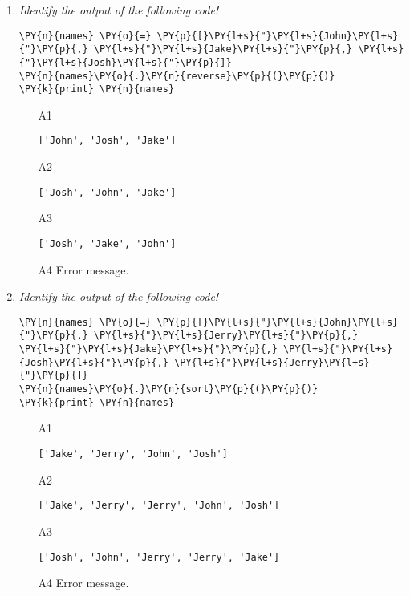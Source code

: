 \begin{enumerate}
\vspace{6mm}

\item {\em Identify the output of the following code!}\\

\begin{Verbatim}[commandchars=\\\{\}]
\PY{n}{names} \PY{o}{=} \PY{p}{[}\PY{l+s}{"}\PY{l+s}{John}\PY{l+s}{"}\PY{p}{,} \PY{l+s}{"}\PY{l+s}{Jake}\PY{l+s}{"}\PY{p}{,} \PY{l+s}{"}\PY{l+s}{Josh}\PY{l+s}{"}\PY{p}{]}
\PY{n}{names}\PY{o}{.}\PY{n}{reverse}\PY{p}{(}\PY{p}{)}
\PY{k}{print} \PY{n}{names}
\end{Verbatim}
\vspace{6mm}

\begin{enumerate}
\item[A1] 
\begin{verbatim}
['John', 'Josh', 'Jake']
\end{verbatim}
\item[A2] 
\begin{verbatim}
['Josh', 'John', 'Jake']
\end{verbatim}
\item[A3] 
\begin{verbatim}
['Josh', 'Jake', 'John']
\end{verbatim}
\item[A4] Error message.
\end{enumerate}

\vspace{6mm}

\item {\em Identify the output of the following code!}\\

\begin{Verbatim}[commandchars=\\\{\}]
\PY{n}{names} \PY{o}{=} \PY{p}{[}\PY{l+s}{"}\PY{l+s}{John}\PY{l+s}{"}\PY{p}{,} \PY{l+s}{"}\PY{l+s}{Jerry}\PY{l+s}{"}\PY{p}{,} \PY{l+s}{"}\PY{l+s}{Jake}\PY{l+s}{"}\PY{p}{,} \PY{l+s}{"}\PY{l+s}{Josh}\PY{l+s}{"}\PY{p}{,} \PY{l+s}{"}\PY{l+s}{Jerry}\PY{l+s}{"}\PY{p}{]}
\PY{n}{names}\PY{o}{.}\PY{n}{sort}\PY{p}{(}\PY{p}{)}
\PY{k}{print} \PY{n}{names}
\end{Verbatim}
\vspace{6mm}

\begin{enumerate}
\item[A1] 
\begin{verbatim}
['Jake', 'Jerry', 'John', 'Josh']
\end{verbatim}
\item[A2] 
\begin{verbatim}
['Jake', 'Jerry', 'Jerry', 'John', 'Josh']
\end{verbatim}
\item[A3] 
\begin{verbatim}
['Josh', 'John', 'Jerry', 'Jerry', 'Jake']
\end{verbatim}
\item[A4] Error message.
\end{enumerate}


\end{enumerate}
